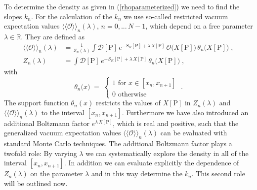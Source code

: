 \documentclass[a4paper,11pt]{article}
\begin{document}
To determine the density as given in (\ref{rhoparameterized}) we need to find the slopes $k_n$. For the
calculation of the $k_n$ we use so-called restricted vacuum expectation values 
$\langle \langle \mathcal{O} \rangle \rangle_{n}(\lambda)$, $n=0, ... \, N\!-\!1$, 
which depend on a free parameter $\lambda \in \mathds{R}$. They are defined as
%
\begin{equation}
\label{eq:restricted-value}
\begin{split}
\langle \langle \mathcal{O} \rangle \rangle_{n}(\lambda) & = \frac{1}{Z_{n}(\lambda)} 
\int \!  \mathcal{D}[\mathrm{P}] \, e^{-S_{R}[\mathrm{P}]+ \lambda \, X [\mathrm{P}] } \, 
\mathcal{O}\bigl( X [\mathrm{P}] \bigr) \, \theta_n\bigl( X[\mathrm{P}] \bigr) \; , \\
 Z_{n}(\lambda) & = \int \! \mathcal{D}[\mathrm{P}] \, 
 e^{-S_{R}[\mathrm{P}]+ \lambda \, X[\mathrm{P}] } \, \theta_n\bigl( X[\mathrm{P}] \bigr) \; ,
\end{split}
\end{equation}
%
with
%
\begin{equation}
\theta_n\bigl( x \bigr) \;  = \; \begin{cases}
1 \text{ for } x \in [x_n,x_{n+1}] \\
0 \text{ otherwise}
\end{cases} \; .
\end{equation}
%
The support function $\theta_n(x)$ restricts the values of $X[\mathrm{P}]$ in $Z_n(\lambda)$  and 
$\langle \langle \mathcal{O} \rangle \rangle_{n}( \lambda )$ to the interval $[x_n,x_{n+1}]$. Furthermore
we have also introduced an additional Boltzmann factor $e^{ \lambda \, X [\mathrm{P}] }$, which is real and positive, 
such that the generalized vacuum expectation values $\langle \langle \mathcal{O} \rangle \rangle_{n}(\lambda)$
can be evaluated with standard Monte Carlo techniques. The additional Boltzmann factor plays a twofold role:
By varying $\lambda$ we can systematically explore the density in all of the interval  $[x_n,x_{n+1}]$. 
In addition we can evaluate explicitly the dependence of $Z_{n}(\lambda)$ on the parameter  $\lambda$ and in
this way determine the $k_n$. This second role will be outlined now.
\end{document}
